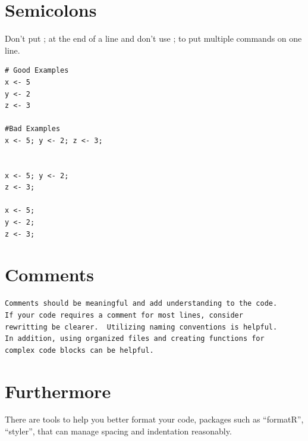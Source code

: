 \documentclass[
]{book}
\begin{document}
\hypertarget{semicolons}{%
\section{Semicolons}\label{semicolons}}

Don't put ; at the end of a line and don't use ; to put multiple commands on one line.

\begin{verbatim}
# Good Examples
x <- 5
y <- 2
z <- 3

#Bad Examples
x <- 5; y <- 2; z <- 3;


x <- 5; y <- 2; 
z <- 3;

x <- 5; 
y <- 2; 
z <- 3;
\end{verbatim}

\hypertarget{comments}{%
\section{Comments}\label{comments}}

\begin{verbatim}
Comments should be meaningful and add understanding to the code.
If your code requires a comment for most lines, consider
rewritting be clearer.  Utilizing naming conventions is helpful.
In addition, using organized files and creating functions for
complex code blocks can be helpful.
\end{verbatim}

\hypertarget{furthermore}{%
\section{Furthermore}\label{furthermore}}

There are tools to help you better format your code, packages such as
``formatR'', ``styler'', that can manage spacing and indentation
reasonably.
\end{document}
